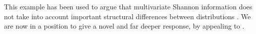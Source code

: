 This example has been used to argue that multivariate Shannon
    information does not take into account important structural
    differences between distributions \citep{multivar-beyondshannon17}.
We are now in a position to give a novel
 and far deeper
 response, by appealing to \scibility.%
